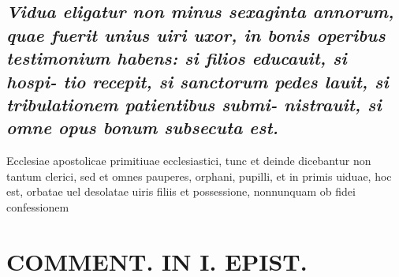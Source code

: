 \documentclass{article}
\begin{document}
\begin{pages}
\subsection*{\textit{Vidua eligatur non minus sexaginta annorum, quae fuerit unius uiri uxor, in bonis operibus testimonium habens: si filios educauit, si hospi- tio recepit, si sanctorum pedes lauit, si tribulationem patientibus submi- nistrauit, si omne opus bonum subsecuta est. }}\pstart Ecclesiae apostolicae primitiuae ecclesiastici, tunc et deinde dicebantur non tantum clerici, sed et omnes pauperes, orphani, pupilli, et in primis uiduae, hoc est, orbatae uel desolatae uiris filiis et possessione, nonnunquam ob fidei confessionem  \pend
\section*{COMMENT. IN I. EPIST. }

\end{pages}
\end{document}
